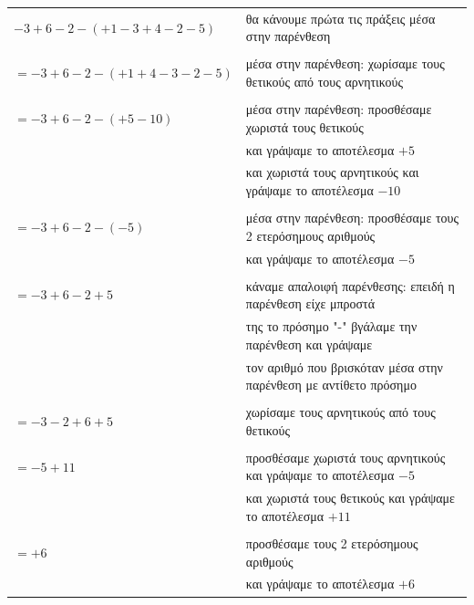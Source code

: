 \documentclass[a4paper,10pt]{report}
\begin{document}
\begin{table}[h]
\begin{tabular}{l|l}
$-3+6-2-(+1-3+4-2-5)$   & θα κάνουμε πρώτα τις πράξεις μέσα στην παρένθεση                  \\
                        &                                                                   \\
$= -3+6-2-(+1+4-3-2-5)$ & μέσα στην παρένθεση: χωρίσαμε τους θετικούς από τους αρνητικούς   \\
                        &                                                                   \\
$= -3+6-2-(+5-10)$      & μέσα στην παρένθεση: προσθέσαμε χωριστά τους θετικούς             \\
                        & και γράψαμε το αποτέλεσμα $+5$                                    \\
                        & και χωριστά τους αρνητικούς και γράψαμε το αποτέλεσμα $-10$       \\
                        &                                                                   \\
$= -3+6-2-(-5)$        & μέσα στην παρένθεση: προσθέσαμε τους 2 ετερόσημους αριθμούς       \\
                        & και γράψαμε το αποτέλεσμα $-5$                                   \\
                        &                                                                   \\
$= -3+6-2+5$             & κάναμε απαλοιφή παρένθεσης: επειδή η παρένθεση είχε μπροστά       \\
                        & της το πρόσημο "-" βγάλαμε την παρένθεση και γράψαμε              \\
                        & τον αριθμό που βρισκόταν μέσα στην παρένθεση με αντίθετο πρόσημο  \\
                        &                                                                   \\
$= -3-2+6+5$             & χωρίσαμε τους αρνητικούς από τους θετικούς                        \\
                        &                                                                   \\
$= -5+11$                 & προσθέσαμε χωριστά τους αρνητικούς και γράψαμε το αποτέλεσμα $-5$ \\
                        & και χωριστά τους θετικούς και γράψαμε το αποτέλεσμα $+11$         \\
                        &                                                                   \\
$= +6$                   & προσθέσαμε τους 2 ετερόσημους αριθμούς                            \\
                        & και γράψαμε το αποτέλεσμα $+6$                                  
\end{tabular}
\end{table}
\end{document}

